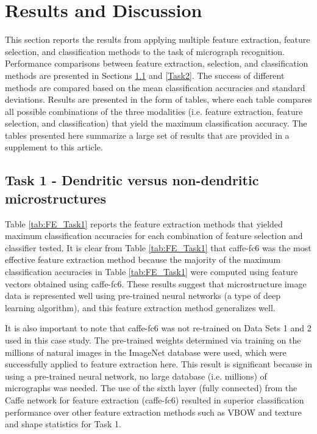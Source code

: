 \section{Results and Discussion}
\label{results}

This section reports the results from applying multiple feature extraction, feature selection, and classification methods to the task of micrograph recognition.    
%
Performance comparisons between feature extraction, selection, and classification methods are presented in Sections \ref{Task1} and \ref{Task2}.  The success of different methods are compared based on the mean classification accuracies and standard deviations.
%
Results are presented in the form of tables, where each table compares all possible combinations of the three modalities (i.e. feature extraction, feature selection, and classification) that yield the maximum classification accuracy.  The tables presented here summarize a large set of results that are provided in a supplement to this article. 

\subsection{Task 1 - Dendritic versus non-dendritic microstructures}
\label{Task1}

Table \ref{tab:FE_Task1} reports the feature extraction methods that yielded maximum classification accuracies for each combination of feature selection and classifier tested.  It is clear from Table \ref{tab:FE_Task1} that caffe-fc6 was the most effective feature extraction method because the majority of the maximum classification accuracies in Table \ref{tab:FE_Task1} were computed using feature vectors obtained using caffe-fc6.  These results suggest that microstructure image data is represented well using pre-trained neural networks (a type of deep learning algorithm), and this feature extraction method generalizes well.  

It is also important to note that caffe-fc6 was not re-trained on Data Sets 1 and 2 used in this case study.  The pre-trained weights determined via training on the millions of natural images in the ImageNet database were used, which were successfully applied to feature extraction here.  This result is significant because in using a pre-trained neural network, no large database (i.e. millions) of micrographs was needed.  The use of the sixth  layer (fully connected) from the Caffe network \cite{Jia2014} for feature extraction (caffe-fc6) resulted in superior classification performance over other feature extraction methods such as VBOW and texture and shape statistics for Task 1. 

